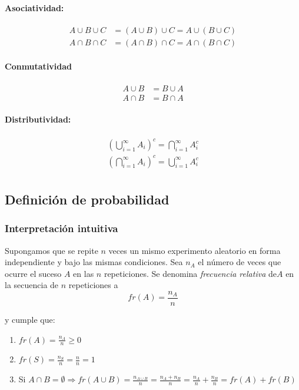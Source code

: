 \paragraph{Asociatividad:}
\begin{align*}
A\cup B\cup C &= (A\cup B)\cup C = A\cup (B\cup C) \\
A\cap B\cap C &= (A\cap B)\cap C = A\cap (B\cap C)
\end{align*}

\paragraph{Conmutatividad}
\begin{align*}
A\cup B &= B\cup A \\
A\cap B &= B\cap A
\end{align*}

\paragraph{Distributividad:}
\begin{align*}
\left(\bigcup_{i=1}^{\infty} A_i\right)^c = \bigcap_{i=1}^{\infty} A_i^c\\
\left(\bigcap_{i=1}^{\infty} A_i\right)^c = \bigcup_{i=1}^{\infty} A_i^c\\
\end{align*}

\subsection{Definición de probabilidad}

\subsubsection{Interpretación intuitiva} 
Supongamos que se repite $n$ veces un mismo experimento aleatorio en forma independiente y bajo las mismas condiciones. Sea $n_A$ el número de veces que ocurre el suceso $A$ en las $n$ repeticiones. Se denomina \textit{frecuencia relativa} de$A$ en la secuencia de $n$ repeticiones a
$$fr(A) = \frac{n_A}{n}$$

y cumple que:
\begin{enumerate}
\item $fr(A) = \frac{n_A}{n} \geq 0$
\item $fr(S) = \frac{n_S}{n} = \frac{n}{n} = 1$
\item Si $A\cap B = \emptyset \Rightarrow fr(A\cup B) = \frac{n_{A\cup B}}{n} = \frac{n_A + n_B}{n} = \frac{n_A}{n} + \frac{n_B}{n} = fr(A) + fr(B)$
\end{enumerate}

